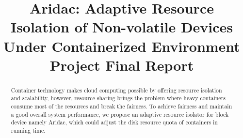 \documentclass[10pt, conference,compsoc]{IEEEtran}
\begin{document}
%
\title{Aridac: Adaptive Resource Isolation of Non-volatile Devices \\Under  Containerized Environment \\ Project Final Report}


\author{
\and
{}
\and
{}
}






\maketitle

\begin{abstract}
Container technology makes cloud computing possible by offering resource isolation and scalability, however, resource sharing brings the problem where heavy containers consume most of the resources and break the fairness. To achieve fairness and maintain a good overall system performance, we propose an adaptive resource isolator for block device namely Aridac, which could adjust the disk resource quota of containers in running time.
\end{abstract}
\end{document}
